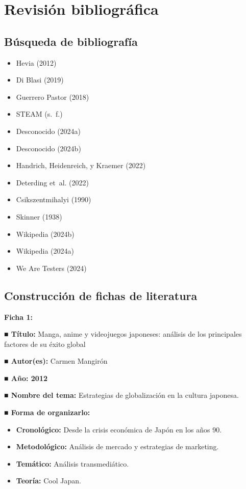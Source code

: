 \documentclass[
  letterpaper,
  DIV=11,
  numbers=noendperiod]{scrreprt}
\providecommand{\tightlist}{%
  \setlength{\itemsep}{0pt}\setlength{\parskip}{0pt}}\usepackage{longtable,booktabs,array}
\begin{document}
\hypertarget{revisiuxf3n-bibliogruxe1fica}{%
\section{Revisión bibliográfica}\label{revisiuxf3n-bibliogruxe1fica}}

\hypertarget{buxfasqueda-de-bibliografuxeda}{%
\subsection{Búsqueda de
bibliografía}\label{buxfasqueda-de-bibliografuxeda}}

\begin{itemize}
\tightlist
\item
  Hevia (2012)
\item
  Di Blasi (2019)
\item
  Guerrero Pastor (2018)
\item
  STEAM (s.~f.)
\item
  Desconocido (2024a)
\item
  Desconocido (2024b)
\item
  Handrich, Heidenreich, y Kraemer (2022)
\item
  Deterding et~al. (2022)
\item
  Csikszentmihalyi (1990)
\item
  Skinner (1938)
\item
  Wikipedia (2024b)
\item
  Wikipedia (2024a)
\item
  We Are Testers (2024)
\end{itemize}

\hypertarget{construcciuxf3n-de-fichas-de-literatura}{%
\subsection{Construcción de fichas de
literatura}\label{construcciuxf3n-de-fichas-de-literatura}}

\textbf{Ficha 1:}

\textbf{■ Título:} Manga, anime y videojuegos japoneses: análisis de los
principales factores de su éxito global

\textbf{■ Autor(es):} Carmen Mangirón

\textbf{■ Año: 2012}

\textbf{■ Nombre del tema:} Estrategias de globalización en la cultura
japonesa.

\textbf{■ Forma de organizarlo:}

\begin{itemize}
\item
  \textbf{Cronológico:} Desde la crisis económica de Japón en los años
  90.
\item
  \textbf{Metodológico:} Análisis de mercado y estrategias de marketing.
\item
  \textbf{Temático:} Análisis transmediático.
\item
  \textbf{Teoría:} Cool Japan.
\end{itemize}
\end{document}
